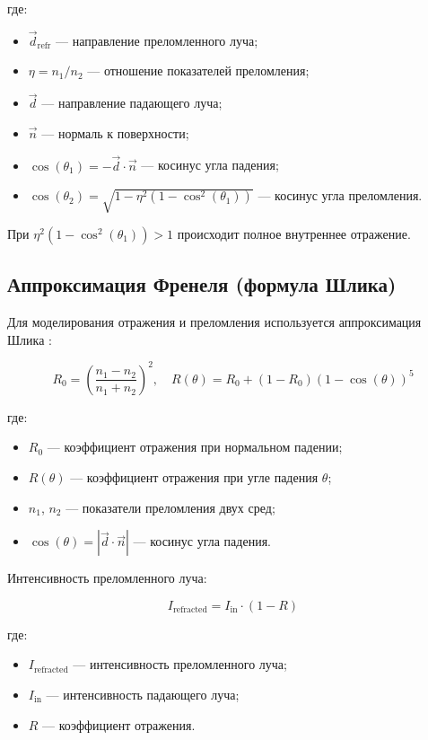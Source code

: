 где:
\begin{itemize}
    \item $\vec{d}_{\text{refr}}$ --- направление преломленного луча;
    \item $\eta = n_1 / n_2$ --- отношение показателей преломления;
    \item $\vec{d}$ --- направление падающего луча;
    \item $\vec{n}$ --- нормаль к поверхности;
    \item $\cos(\theta_1) = -\vec{d} \cdot \vec{n}$ --- косинус угла падения;
    \item $\cos(\theta_2) = \sqrt{1 - \eta^2 (1 - \cos^2(\theta_1))}$ --- косинус угла преломления.
\end{itemize}

При $\eta^2 (1 - \cos^2(\theta_1)) > 1$ происходит полное внутреннее отражение.

\subsection{Аппроксимация Френеля (формула Шлика)}

Для моделирования отражения и преломления используется аппроксимация Шлика \cite{7}:

\begin{equation}
R_0 = \left(\frac{n_1 - n_2}{n_1 + n_2}\right)^2, \quad R(\theta) = R_0 + (1 - R_0)(1 - \cos(\theta))^5
\end{equation}

где:
\begin{itemize}
    \item $R_0$ --- коэффициент отражения при нормальном падении;
    \item $R(\theta)$ --- коэффициент отражения при угле падения $\theta$;
    \item $n_1$, $n_2$ --- показатели преломления двух сред;
    \item $\cos(\theta) = |\vec{d} \cdot \vec{n}|$ --- косинус угла падения.
\end{itemize}

Интенсивность преломленного луча:

\begin{equation}
I_{\text{refracted}} = I_{\text{in}} \cdot (1 - R)
\end{equation}

где:
\begin{itemize}
    \item $I_{\text{refracted}}$ --- интенсивность преломленного луча;
    \item $I_{\text{in}}$ --- интенсивность падающего луча;
    \item $R$ --- коэффициент отражения.
\end{itemize}

